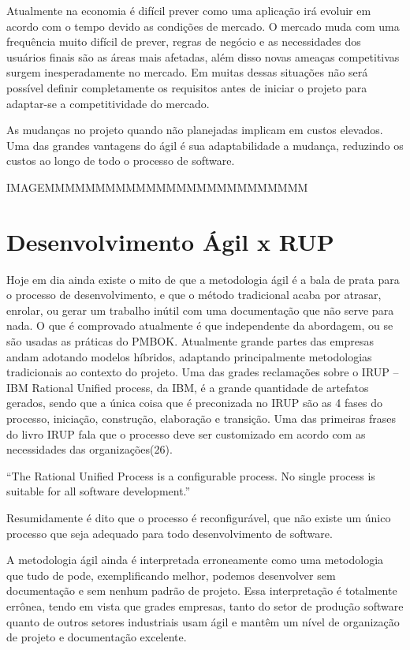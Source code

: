 Atualmente na economia é difícil prever como uma aplicação irá evoluir em acordo com o tempo devido as condições de mercado. O mercado muda com uma frequência muito difícil de prever, regras de negócio e as necessidades dos usuários finais são as áreas mais afetadas, além disso novas ameaças competitivas surgem inesperadamente no mercado. Em muitas dessas situações não será possível definir completamente os requisitos antes de iniciar o projeto para adaptar-se a competitividade do mercado.

As mudanças no projeto quando não planejadas implicam em custos elevados. Uma das grandes vantagens do ágil é sua adaptabilidade a mudança, reduzindo os custos ao longo de todo o processo de software.

IMAGEMMMMMMMMMMMMMMMMMMMMMMMMMM

\section{Desenvolvimento Ágil x RUP}

Hoje em dia ainda existe o mito de que a metodologia ágil é a bala de prata para o processo de desenvolvimento, e que o método tradicional acaba por atrasar, enrolar, ou gerar um trabalho inútil com uma documentação que não serve para nada. O que é comprovado atualmente é que independente da abordagem, ou se são usadas as práticas do PMBOK.
Atualmente grande partes das empresas andam adotando modelos híbridos, adaptando principalmente metodologias tradicionais ao contexto do projeto. Uma das grades reclamações sobre o IRUP – IBM Rational Unified process, da IBM, é a grande quantidade de artefatos gerados, sendo que a única coisa que é preconizada no IRUP são as 4 fases do processo, iniciação, construção, elaboração e transição. Uma das primeiras frases do livro IRUP fala que o processo deve ser customizado em acordo com as necessidades das organizações(26).

“The Rational Unified Process is a configurable process. No single process is suitable for all software development.”

Resumidamente é dito que o processo é reconfigurável, que não existe um único processo que seja adequado para todo desenvolvimento de software.

A metodologia ágil ainda é interpretada erroneamente como uma metodologia que tudo de pode, exemplificando melhor, podemos desenvolver sem documentação e sem nenhum padrão de projeto. Essa interpretação é totalmente errônea, tendo em vista que grades empresas, tanto do setor de produção software quanto de outros setores industriais usam ágil e mantêm um nível de organização de projeto e documentação excelente.

